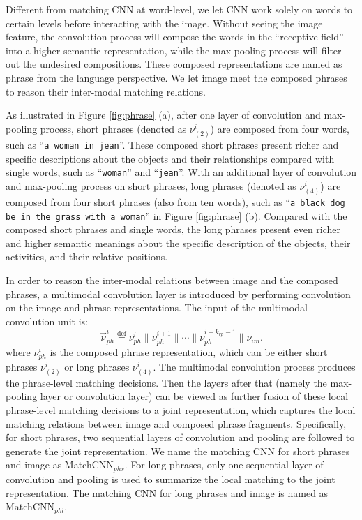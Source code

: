 \documentclass[10pt,twocolumn,letterpaper]{article}
\begin{document}
Different from matching CNN at word-level, we let CNN work solely on words to certain levels before interacting with the image.  Without seeing the image feature, the convolution process will compose the words in the ``receptive field'' into a higher semantic representation, while the max-pooling process will filter out the undesired compositions. These composed representations are named as phrase from the language perspective. We let image meet the composed phrases to reason their inter-modal matching relations.


As  illustrated in Figure \ref{fig:phrase} (a), after one layer of convolution and max-pooling process, short phrases (denoted as $\nu_{(2)}^i$) are composed from four words, such as ``\texttt{\small a woman in jean}''. These composed short phrases present richer and specific descriptions about the objects and their relationships compared with single words, such as ``\texttt{\small woman}'' and ``\texttt{\small jean}''. With an additional layer of convolution and max-pooling process on short phrases, long phrases (denoted as $\nu_{(4)}^i$) are composed from four short phrases (also from ten words), such as ``\texttt{\small a black dog be in the grass with a woman}'' in Figure \ref{fig:phrase} (b). Compared with the composed short phrases and single words, the long phrases present even richer and higher semantic meanings about the specific description of the objects, their activities, and their relative positions.


In order to reason the inter-modal relations between image and the composed phrases, a multimodal convolution layer is introduced by performing convolution on the image and phrase representations. The input of the multimodal convolution unit is:
\begin{equation}
\label{eq_multimodal_phrase1}
\vec{\nu}_{ph}^{i}  \overset{\text{def}}{=}  \nu_{ph}^{i} \parallel \nu_{ph}^{i+1} \parallel \cdots \parallel\nu_{ph}^{i+k_{rp}-1}\parallel\nu_{im}.
\end{equation}
where $\nu_{ph}^{i}$ is the composed phrase representation, which can be either short phrases $\nu_{(2)}^i$ or long phrases $\nu_{(4)}^i$. The multimodal convolution process produces the phrase-level matching decisions. Then the layers after that (namely the max-pooling layer or convolution layer) can be viewed as further fusion of these local phrase-level matching decisions to a  joint representation, which captures the local matching relations between image and composed phrase fragments. Specifically, for short phrases, two sequential layers of convolution and pooling are followed to generate the  joint representation. We name the matching CNN for short phrases and image as MatchCNN$_{phs}$. For long phrases, only one sequential layer of convolution and pooling is used to summarize the local matching to the joint representation. The matching CNN for long phrases and image is named as MatchCNN$_{phl}$.
\end{document}
